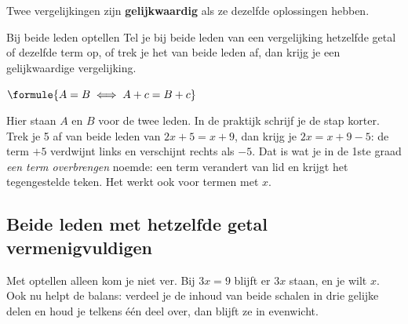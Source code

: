 \begin{theorie}
Twee vergelijkingen zijn \textbf{\textcolor{accent}{gelijkwaardig}} als ze dezelfde oplossingen hebben.

\begin{stelling}{Bij beide leden optellen}
Tel je bij beide leden van een vergelijking hetzelfde getal of dezelfde term op, of trek je het van beide leden af, dan krijg je een gelijkwaardige vergelijking.

\vspace{1mm}
\qquad $\formule{A = B \iff A + c = B + c}$
\end{stelling}
\end{theorie}

Hier staan $A$ en $B$ voor de twee leden. In de praktijk schrijf je de stap korter. Trek je 5 af van beide leden van $2x + 5 = x + 9$, dan krijg je $2x = x + 9 - 5$: de term $+5$ verdwijnt links en verschijnt rechts als $-5$. Dat is wat je in de 1ste graad \textit{een term overbrengen} noemde: een term verandert van lid en krijgt het tegengestelde teken. Het werkt ook voor termen met $x$.



\begin{oefeningen}
\end{oefeningen}

\subsection{Beide leden met hetzelfde getal vermenigvuldigen}

Met optellen alleen kom je niet ver. Bij $3x = 9$ blijft er $3x$ staan, en je wilt $x$. Ook nu helpt de balans: verdeel je de inhoud van beide schalen in drie gelijke delen en houd je telkens één deel over, dan blijft ze in evenwicht.

